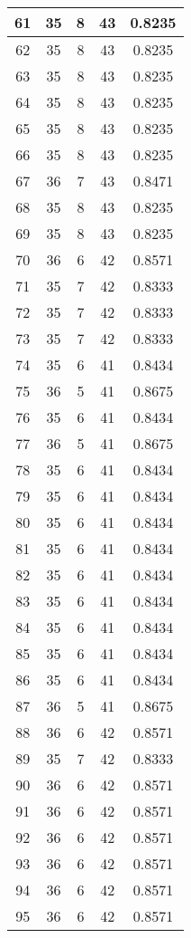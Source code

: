 \documentclass[letterpaper, 12pt]{article}
\begin{document}
\begin{longtable}{|c|c|c|c|c|}
\hline
61 & 35 & 8 & 43 & 0.8235 \\
\hline
62 & 35 & 8 & 43 & 0.8235 \\
\hline
63 & 35 & 8 & 43 & 0.8235 \\
\hline
64 & 35 & 8 & 43 & 0.8235 \\
\hline
65 & 35 & 8 & 43 & 0.8235 \\
\hline
66 & 35 & 8 & 43 & 0.8235 \\
\hline
67 & 36 & 7 & 43 & 0.8471 \\
\hline
68 & 35 & 8 & 43 & 0.8235 \\
\hline
69 & 35 & 8 & 43 & 0.8235 \\
\hline
70 & 36 & 6 & 42 & 0.8571 \\
\hline
71 & 35 & 7 & 42 & 0.8333 \\
\hline
72 & 35 & 7 & 42 & 0.8333 \\
\hline
73 & 35 & 7 & 42 & 0.8333 \\
\hline
74 & 35 & 6 & 41 & 0.8434 \\
\hline
75 & 36 & 5 & 41 & 0.8675 \\
\hline
76 & 35 & 6 & 41 & 0.8434 \\
\hline
77 & 36 & 5 & 41 & 0.8675 \\
\hline
78 & 35 & 6 & 41 & 0.8434 \\
\hline
79 & 35 & 6 & 41 & 0.8434 \\
\hline
80 & 35 & 6 & 41 & 0.8434 \\
\hline
81 & 35 & 6 & 41 & 0.8434 \\
\hline
82 & 35 & 6 & 41 & 0.8434 \\
\hline
83 & 35 & 6 & 41 & 0.8434 \\
\hline
84 & 35 & 6 & 41 & 0.8434 \\
\hline
85 & 35 & 6 & 41 & 0.8434 \\
\hline
86 & 35 & 6 & 41 & 0.8434 \\
\hline
87 & 36 & 5 & 41 & 0.8675 \\
\hline
88 & 36 & 6 & 42 & 0.8571 \\
\hline
89 & 35 & 7 & 42 & 0.8333 \\
\hline
90 & 36 & 6 & 42 & 0.8571 \\
\hline
91 & 36 & 6 & 42 & 0.8571 \\
\hline
92 & 36 & 6 & 42 & 0.8571 \\
\hline
93 & 36 & 6 & 42 & 0.8571 \\
\hline
94 & 36 & 6 & 42 & 0.8571 \\
\hline
95 & 36 & 6 & 42 & 0.8571 \\

\end{longtable}
\end{document}
